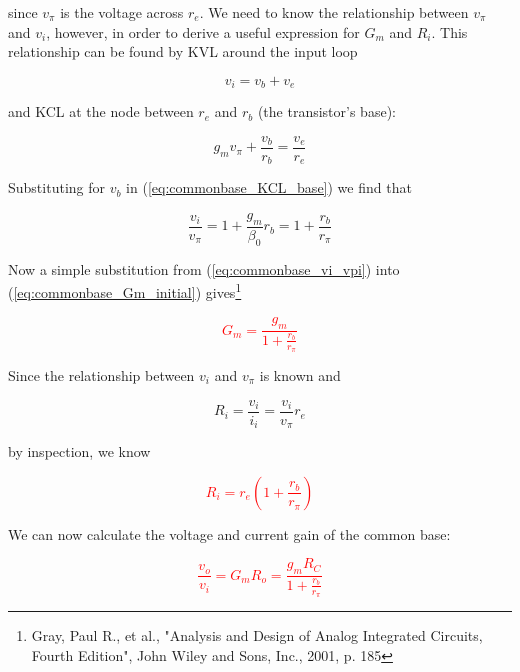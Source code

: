\noindent since $v_{\pi}$ is the voltage across $r_{e}$. We need to know the relationship between $v_{\pi}$ and $v_{i}$, however, in order to derive a useful expression for $G_{m}$ and $R_{i}$. This relationship can be found by KVL around the input loop

\begin{equation}
v_{i} = v_{b} + v_{e}
\end{equation}

\noindent and KCL at the node between $r_{e}$ and $r_{b}$ (the transistor's base):

\begin{equation}
g_{m}v_{\pi} + \frac{v_{b}}{r_{b}} = \frac{v_{e}}{r_{e}}
\label{eq:commonbase_KCL_base}
\end{equation}

\noindent Substituting for $v_{b}$ in (\ref{eq:commonbase_KCL_base}) we find that

\begin{equation}
\frac{v_{i}}{v_{\pi}} = 1 + \frac{g_{m}}{\beta_{0}}r_{b} = 1 + \frac{r_{b}}{r_{\pi}}
\label{eq:commonbase_vi_vpi}
\end{equation}

\noindent Now a simple substitution from (\ref{eq:commonbase_vi_vpi}) into (\ref{eq:commonbase_Gm_initial}) gives\footnote{Gray, Paul R., et al., "Analysis and Design of Analog Integrated Circuits, Fourth Edition", John Wiley and Sons, Inc., 2001, p. 185}

\textcolor{red}{
\begin{equation}
G_{m} = \frac{g_{m}}{1+\frac{r_{b}}{r_{\pi}}}
\end{equation}
}

\noindent Since the relationship between $v_{i}$ and $v_{\pi}$ is known and

\begin{equation}
R_{i} = \frac{v_{i}}{i_{i}} = \frac{v_{i}}{v_{\pi}}r_{e}
\end{equation}

\noindent by inspection, we know

\textcolor{red}{
\begin{equation}
R_{i} = r_{e}\left(1 + \frac{r_{b}}{r_{\pi}}\right)
\end{equation}
}

\noindent We can now calculate the voltage and current gain of the common base:

\textcolor{red}{
\begin{equation}
\frac{v_{o}}{v_{i}} = G_{m}R_{o} = \frac{g_{m}R_{C}}{1+\frac{r_{b}}{r_{\pi}}}
\end{equation}
}

